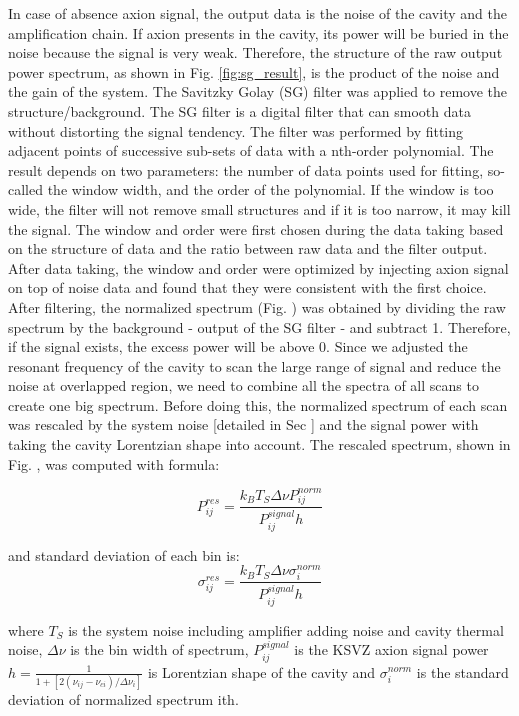 In case of absence axion signal, the output data is the noise of the cavity and the amplification chain. If axion presents in the cavity, its power will be buried in the noise because the signal is very weak. Therefore, the structure of the raw output power spectrum, as shown in Fig. \ref{fig:sg_result}, is the product of the noise and the gain of the system. The Savitzky Golay (SG) filter \cite{SGFilter} was applied to remove the structure/background. The SG filter is a digital filter that can smooth data without distorting the signal tendency. The filter was performed by fitting adjacent points of successive sub-sets of data with a nth-order polynomial. The result depends on two parameters: the number of data points used for fitting, so-called the window width, and the order of the polynomial. If the window is too wide, the filter will not remove small structures and if it is too narrow, it may kill the signal. The window and order were first chosen during the data taking based on the structure of data and the ratio between raw data and the filter output. After data taking, the window and order were optimized by injecting axion signal on top of noise data and found that they were consistent with the first choice.
After filtering, the normalized spectrum (Fig. \cite{fig:}) was obtained by dividing the raw spectrum by the background - output of the SG filter - and subtract 1. Therefore, if the signal exists, the excess power will be above 0.
Since we adjusted the resonant frequency of the cavity to scan the large range of signal and reduce the noise at overlapped region, we need to combine all the spectra of all scans to create one big spectrum. Before doing this, the normalized spectrum of each scan was rescaled by the system noise [detailed in Sec \cite{hemtcalibration}] and the signal power with taking the cavity Lorentzian shape into account. The rescaled spectrum, shown in Fig. \cite{}, was computed with formula:

\begin{equation}
  \label{eq:respower_eqn}
  P_{ij}^{res} = \frac{k_{B}T_{S}\Delta\nu P_{ij}^{norm}}{P_{ij}^{signal} h}
\end{equation}

and standard deviation of each bin is:
\begin{equation}
  \label{eq:ressigma_eqn}
  \sigma_{ij}^{res} = \frac{k_{B}T_{S}\Delta\nu \sigma_{i}^{norm}}{P_{ij}^{signal} h}
\end{equation}

where $T_{S}$ is the system noise including amplifier adding noise and cavity thermal noise, $\Delta\nu$ is the bin width of spectrum, $P_{ij}^{signal}$ is the KSVZ axion signal power
$h = \frac{1}{1 + [2(\nu_{ij} - \nu_{ci})/\Delta\nu_{i}]}$ is Lorentzian shape of the cavity
and $\sigma_{i}^{norm}$ is the standard deviation of normalized spectrum ith.

